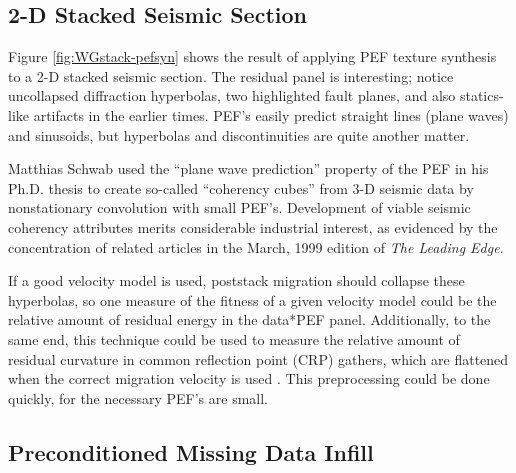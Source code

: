 	\subsection{ 2-D Stacked Seismic Section}

	Figure \ref{fig:WGstack-pefsyn} shows the result of applying PEF texture synthesis
	to a 2-D stacked seismic section.  The residual panel is interesting; notice 
	uncollapsed diffraction hyperbolas, two highlighted fault planes, and also statics-like
	artifacts in the earlier times.  PEF's easily predict straight lines
	(plane waves) and sinusoids, but hyperbolas and discontinuities are quite another matter.
	\par
	Matthias Schwab used the ``plane wave prediction'' property of the PEF in his Ph.D.
	thesis {\small \cite{Schwab.sepphd.99}} to create so-called ``coherency cubes'' from 
	3-D seismic data by nonstationary convolution with small PEF's.  Development of viable
	seismic coherency attributes merits considerable industrial interest, as evidenced by 
	the concentration of related articles in the March, 1999 edition of {\em The Leading Edge}. 
	\par
	If a good velocity model is used, poststack migration should collapse these hyperbolas, 
	so one measure of the fitness of a given velocity model could be the relative amount of 
	residual energy in the data*PEF panel.  
	Additionally, to the same end, this technique could be used to measure the relative amount 
	of residual curvature in common reflection point (CRP) gathers, which are flattened when 
	the correct migration velocity is used \cite{3dsi}.  This preprocessing could be done
	quickly, for the necessary PEF's are small.


	\subsection{ Preconditioned Missing Data Infill}

